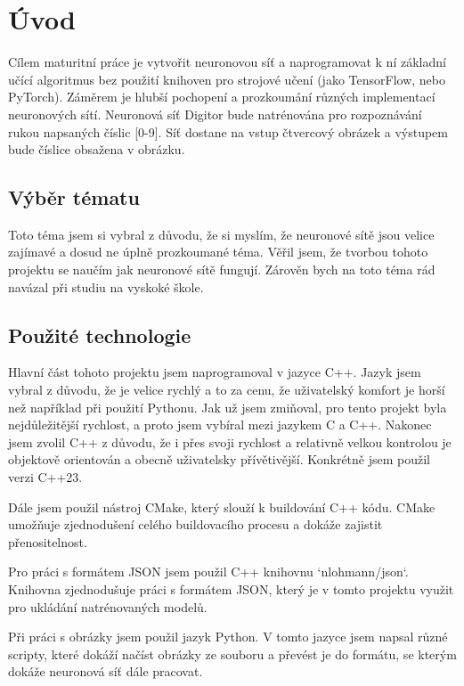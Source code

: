 \section{Úvod}
Cílem maturitní práce je vytvořit neuronovou síť a naprogramovat k ní základní učící algoritmus bez použití knihoven pro strojové učení (jako TensorFlow, nebo PyTorch).
Záměrem je hlubší pochopení a prozkoumání různých implementací neuronových sítí.
Neuronová síť Digitor bude natrénována pro rozpoznávání rukou napsaných číslic [0-9].
Síť dostane na vstup čtvercový obrázek a výstupem bude číslice obsažena v obrázku.

\subsection{Výběr tématu}
Toto téma jsem si vybral z důvodu, že si myslím, že neuronové sítě jsou velice zajímavé a dosud ne úplně prozkoumané téma.
Věřil jsem, že tvorbou tohoto projektu se naučím jak neuronové sítě fungují.
Zárověn bych na toto téma rád navázal při studiu na vyskoké škole.

\subsection{Použité technologie}
Hlavní část tohoto projektu jsem naprogramoval v jazyce C++.
Jazyk jsem vybral z důvodu, že je velice rychlý a to za cenu, že uživatelský komfort je horší než například při použití Pythonu.
Jak už jsem zmiňoval, pro tento projekt byla nejdůležitější rychlost, a proto jsem vybíral mezi jazykem C a C++.
Nakonec jsem zvolil C++ z důvodu, že i přes svoji rychlost a relativně velkou kontrolou je objektově orientován a obecně uživatelsky přívětivější.
Konkrétně jsem použil verzi C++23.

Dále jsem použil nástroj CMake, který slouží k buildování C++ kódu.
CMake umožňuje zjednodušení celého buildovacího procesu a dokáže zajistit přenositelnost.

Pro práci s formátem JSON jsem použil C++ knihovnu `nlohmann/json`\cite{json}.
Knihovna zjednodušuje práci s formátem JSON, který je v tomto projektu využit pro ukládání natrénovaných modelů.

Při práci s obrázky jsem použil jazyk Python. V tomto jazyce jsem napsal různé scripty,
které dokáží načíst obrázky ze souboru a převést je do formátu, se kterým dokáže neuronová síť dále pracovat.

